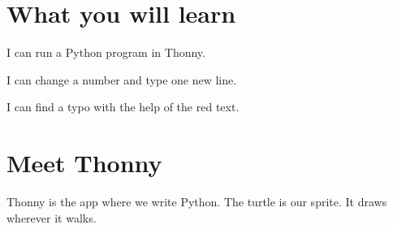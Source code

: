 
\section{What you will learn}
\begin{ican}
  \item I can run a Python program in Thonny.
  \item I can change a number and type one new line.
  \item I can find a typo with the help of the red text.
\end{ican}

\section{Meet Thonny}
Thonny is the app where we write Python. The turtle is our sprite. It draws wherever it walks.

